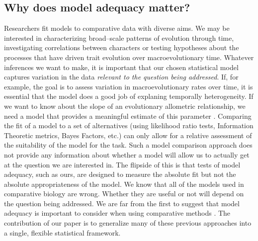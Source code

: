 \documentclass[a4paper,11pt]{article}
\begin{document}
\subsection{Why does model adequacy matter?}

Researchers fit models to comparative data with diverse aims. We may be interested in characterizing broad--scale patterns of evolution through time, investigating correlations between characters or testing hypotheses about the processes that have driven trait evolution over macroevolutionary time. Whatever inferences we want to make, it is important that our chosen statistical model captures variation in the data \emph{relevant to the question being addressed}. If, for example, the goal is to assess variation in macroevolutionary rates over time, it is essential that the model does a good job of explaning temporally heterogeneity. If we want to know about the slope of an evolutionary allometric relationship, we need a model that provides a meaningful estimate of this parameter \citep{Hansen2012}. Comparing the fit of a model to a set of alternatives (using likelihood ratio tests, Information Theoretic metrics, Bayes Factors, etc.) can only allow for a relative assessment of the suitability of the model for the task. Such a model comparison approach does not provide any information about whether a model will allow us to actually get at the question we are interested in. The flipside of this is that tests of model adequacy, such as ours, are designed to measure the absolute fit but not the absolute appropriateness of the model. We know that all of the models used in comparative biology are wrong. Whether they are useful or not will depend on the question being addressed. We are far from the first to suggest that model adequacy is important to consider when using comparative methods \citep[see, for example][]{Felsenstein1985, Felsenstein1988, HarveyPagel1991, Garland1992, Diaz1996, HansenMartins1996, Price1997, Garland1999, GarlandIves2000, HansenOrzack2005, Hansen2012, Felsenstein2012, Boettiger2012, SlaterPennell, Beaulieu2013, Blackmon2014}. The contribution of our paper is to generalize many of these previous approaches into a single, flexible statistical framework. 
\end{document}
